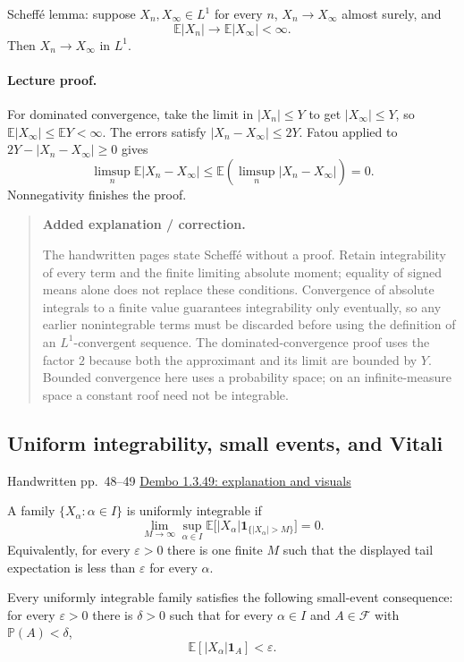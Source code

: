 \documentclass[11pt,letterpaper]{article}
\newcommand{\lecturesection}[1]{\subsection{#1}}
\begin{document}
Scheffé lemma: suppose $X_n,X_\infty\in L^1$ for every $n$, $X_n\to X_\infty$ almost surely, and \[\mathbb E|X_n|\longrightarrow\mathbb E|X_\infty|<\infty.\] Then $X_n\to X_\infty$ in $L^1$.

\paragraph{Lecture proof.}
For dominated convergence, take the limit in $|X_n|\le Y$ to get $|X_\infty|\le Y$, so $\mathbb E|X_\infty|\le\mathbb E Y<\infty$. The errors satisfy $|X_n-X_\infty|\le2Y$. Fatou applied to $2Y-|X_n-X_\infty|\ge0$ gives \[\limsup_n\mathbb E|X_n-X_\infty|\le\mathbb E(\limsup_n|X_n-X_\infty|)=0.\] Nonnegativity finishes the proof.

\begin{quote}\small\textbf{Added explanation / correction.}

The handwritten pages state Scheffé without a proof. Retain integrability of every term and the finite limiting absolute moment; equality of signed means alone does not replace these conditions. Convergence of absolute integrals to a finite value guarantees integrability only eventually, so any earlier nonintegrable terms must be discarded before using the definition of an $L^1$-convergent sequence. The dominated-convergence proof uses the factor $2$ because both the approximant and its limit are bounded by $Y$. Bounded convergence here uses a probability space; on an infinite-measure space a constant roof need not be integrable.
\end{quote}

\hypertarget{l6-s4}{}
\lecturesection{Uniform integrability, small events, and Vitali}
{\small\textcolor{lectureink}{Handwritten pp.\ 48--49} \quad \href{https://josephrbailey.com/probability/\#entry-1-3-49}{Dembo 1.3.49: explanation and visuals}}

A family $\{X_\alpha:\alpha\in I\}$ is uniformly integrable if \[\lim_{M\to\infty}\sup_{\alpha\in I}\mathbb E\bigl[|X_\alpha|\mathbf1_{\{|X_\alpha|>M\}}\bigr]=0.\] Equivalently, for every $\varepsilon>0$ there is one finite $M$ such that the displayed tail expectation is less than $\varepsilon$ for every $\alpha$.

Every uniformly integrable family satisfies the following small-event consequence: for every $\varepsilon>0$ there is $\delta>0$ such that for every $\alpha\in I$ and $A\in\mathcal F$ with $\mathbb P(A)<\delta$, \[\mathbb E[|X_\alpha|\mathbf1_A]<\varepsilon.\]
\end{document}
